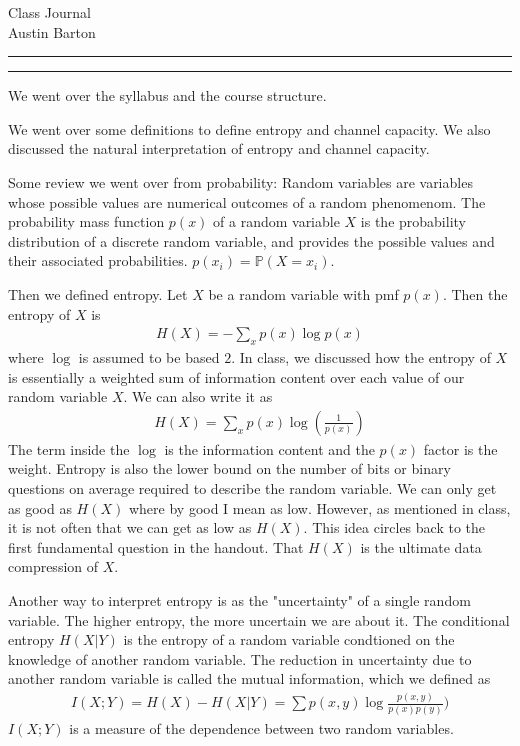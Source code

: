 \documentclass{article}
\newcommand{\Pro}{\ensuremath{\mathbb{P}}}
\newcounter{questionCounter}
\newcounter{partCounter}[questionCounter]
\newenvironment{question}[2][\arabic{questionCounter}]{%
    \setcounter{partCounter}{0}%
    \vspace{.25in} \hrule \vspace{0.5em}%
        \noindent{\bf \large#2}%
    \vspace{0.5em} \hrule \vspace{.10in}%
    \addtocounter{questionCounter}{1}%
}{}
\begin{document}
\begin{center}
{\Huge Class Journal}\\
\vspace{4pt}
\Large Austin Barton
\end{center}



\vspace{5mm}


\begin{question}{Main Theorems/Ideas in the lecture}
We went over the syllabus and the course structure.

We went over some definitions to define entropy and channel capacity. We also discussed the natural interpretation of entropy and channel capacity.

Some review we went over from probability: Random variables are variables whose possible values are numerical outcomes of a random phenomenom. The probability mass function $p(x)$ of a random variable $X$ is the probability distribution of a discrete random variable, and provides the possible values and their associated probabilities. $p(x_i) = \Pro(X=x_i)$. 

Then we defined entropy. Let $X$ be a random variable with pmf $p(x)$. Then the entropy of $X$ is
\begin{gather*}
    H(X) = -\sum_{x}p(x)\log p(x)
\end{gather*}
where $\log $ is assumed to be based $2$. In class, we discussed how the entropy of $X$ is essentially a weighted sum of information content over each value of our random variable $X$. We can also write it as 
\begin{gather*}
    H(X) = \sum_{x}p(x)\log(\frac{1}{p(x)})
\end{gather*}
The term inside the $\log$ is the information content and the $p(x)$ factor is the weight. Entropy is also the lower bound on the number of bits or binary questions on average required to describe the random variable. We can only get as good as $H(X)$ where by good I mean as low. However, as mentioned in class, it is not often that we can get as low as $H(X)$. This idea circles back to the first fundamental question in the handout. That $H(X)$ is the ultimate data compression of $X$.

Another way to interpret entropy is as the "uncertainty" of a single random variable. The higher entropy, the more uncertain we are about it. The conditional entropy $H(X|Y)$ is the entropy of a random variable condtioned on the knowledge of another random variable. The reduction in uncertainty due to another random variable is called the mutual information, which we defined as
\begin{gather*}
I(X;Y) = H(X) - H(X|Y) = \sum p(x,y)\log\frac{p(x,y)}{p(x)p(y)})
\end{gather*}
$I(X;Y)$ is a measure of the dependence between two random variables.


\end{question}
\end{document}
